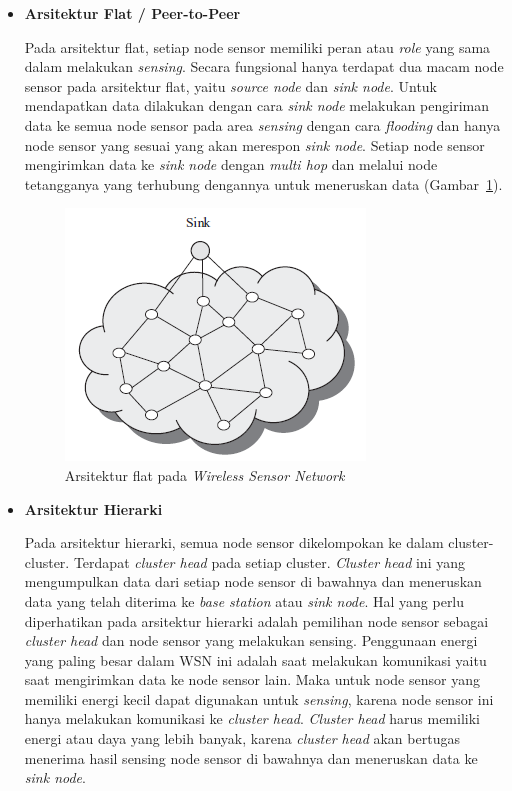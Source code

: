 \documentclass[a4paper,twoside]{article}
\begin{document}
\begin{enumerate}
\begin{itemize}
\begin{itemize}
\item \textbf{Arsitektur Flat / Peer-to-Peer}

Pada arsitektur flat, setiap node sensor memiliki peran atau \textit{role} yang sama dalam melakukan \textit{sensing}. Secara fungsional hanya terdapat dua macam node sensor pada arsitektur flat, yaitu \textit{source node} dan \textit{sink node}. Untuk mendapatkan data dilakukan dengan cara \textit{sink node} melakukan pengiriman data ke semua node sensor pada area \textit{sensing} dengan cara \textit{flooding} dan hanya node sensor yang sesuai yang akan merespon \textit{sink node}. Setiap node sensor mengirimkan data ke \textit{sink node} dengan \textit{multi hop} dan melalui node tetangganya yang terhubung dengannya untuk meneruskan data (Gambar~\ref{fig:flat}).
\begin{figure} [H]
	\centering  
	\includegraphics[scale=0.6]{Gambar/flat}  
	\caption[Arsitektur flat pada \textit{Wireless Sensor Network}]{Arsitektur flat pada \textit{Wireless Sensor Network}} 
	\label{fig:flat} 
\end{figure} 

\item \textbf{Arsitektur Hierarki}

Pada arsitektur hierarki, semua node sensor dikelompokan ke dalam cluster-cluster. Terdapat \textit{cluster head} pada setiap cluster. \textit{Cluster head} ini yang mengumpulkan data dari setiap node sensor di bawahnya dan meneruskan data yang telah diterima ke \textit{base station} atau \textit{sink node}. Hal yang perlu diperhatikan pada arsitektur hierarki adalah pemilihan node sensor sebagai \textit{cluster head} dan node sensor yang melakukan sensing. Penggunaan energi yang paling besar dalam WSN ini adalah saat melakukan komunikasi yaitu saat mengirimkan data ke node sensor lain. Maka untuk node sensor yang memiliki energi kecil dapat digunakan untuk \textit{sensing}, karena node sensor ini hanya melakukan komunikasi ke \textit{cluster head}. \textit{Cluster head} harus memiliki energi atau daya yang lebih banyak, karena \textit{cluster head} akan bertugas menerima hasil sensing node sensor di bawahnya dan meneruskan data ke \textit{sink node}. 


\end{itemize}
\end{itemize}
\end{enumerate}
\end{document}

